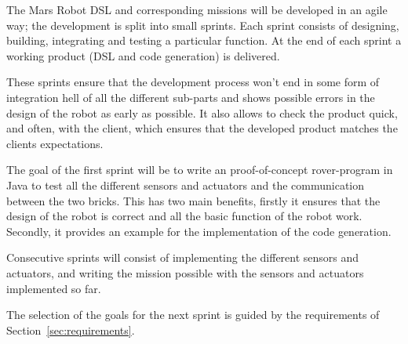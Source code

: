 The Mars Robot DSL and corresponding missions will be developed in an agile way;
the development is split into small sprints. Each sprint consists of designing,
building, integrating and testing a particular function. At the end of each
sprint a working product (DSL and code generation) is delivered. 

These sprints ensure that the development process won't end in some form of
integration hell of all the different sub-parts and shows possible errors
in the design of the robot as early as possible. It also allows to check the
product quick, and often, with the client, which ensures that the developed
product matches the clients expectations. 

\bigskip

The goal of the first sprint will be to write an proof-of-concept rover-program
in Java to test all the different sensors and actuators and the communication
between the two bricks. This has two main benefits, firstly it ensures that the
design of the robot is correct and all the basic function of the robot work.
Secondly, it provides an example for the implementation of the code generation.

Consecutive sprints will consist of implementing the different sensors and
actuators, and writing the mission possible with the sensors and actuators 
implemented so far. 

The selection of the goals for the next sprint is guided by the requirements of 
Section~\ref{sec:requirements}. 